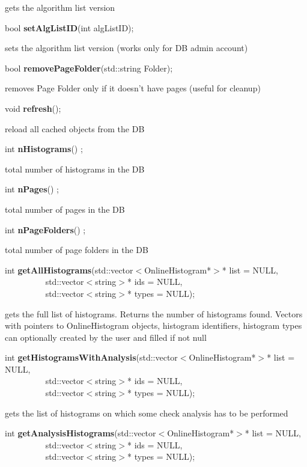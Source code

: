  gets the algorithm list version


\item    bool {\bf setAlgListID}(int algListID);


 sets the algorithm list version (works only for DB admin account)


\item    bool {\bf removePageFolder}(std::string Folder);


 removes Page Folder only if it doesn't have pages (useful for cleanup)


\item    void {\bf refresh}();


 reload all cached objects from the DB


\item    int {\bf nHistograms}() ;

 total number of histograms in the DB


\item    int {\bf nPages}() ;

 total number of pages in the DB


\item    int {\bf nPageFolders}() ;

  total number of page folders in the DB


\item    int {\bf getAllHistograms}(std::vector$<$OnlineHistogram*$>$* list = NULL,\\\mbox{}~~~~~~~~~
		       std::vector$<$string$>$* ids = NULL,\\\mbox{}~~~~~~~~~
		       std::vector$<$string$>$* types = NULL);

 gets the full list of histograms. Returns the number of histograms found. Vectors with pointers
 to OnlineHistogram objects, histogram identifiers, histogram types can optionally created  by the user
 and filled if not null


\item    int {\bf getHistogramsWithAnalysis}(std::vector$<$OnlineHistogram*$>$* list = NULL,\\\mbox{}~~~~~~~~~
				std::vector$<$string$>$* ids = NULL,\\\mbox{}~~~~~~~~~
				std::vector$<$string$>$* types = NULL);

 gets the list of histograms on which some check analysis has to be performed 


\item    int {\bf getAnalysisHistograms}(std::vector$<$OnlineHistogram*$>$* list = NULL,\\\mbox{}~~~~~~~~~
			    std::vector$<$string$>$* ids = NULL,\\\mbox{}~~~~~~~~~
			    std::vector$<$string$>$* types = NULL);

